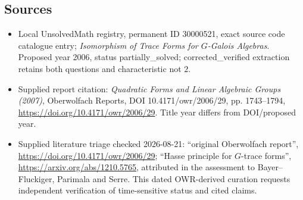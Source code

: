 \documentclass[11pt]{article}
\begin{document}
\subsection{Sources}
\begin{itemize}
\item Local UnsolvedMath registry, permanent ID 30000521, exact source code catalogue entry; \emph{Isomorphism of Trace Forms for $G$-Galois Algebras}. Proposed year 2006, status partially\_solved; corrected\_verified extraction retains both questions and characteristic not $2$.
\item Supplied report citation: \emph{Quadratic Forms and Linear Algebraic Groups (2007)}, Oberwolfach Reports, DOI 10.4171/owr/2006/29, pp. 1743--1794, \url{https://doi.org/10.4171/owr/2006/29}. Title year differs from DOI/proposed year.
\item Supplied literature triage checked 2026-08-21: ``original Oberwolfach report'', \url{https://doi.org/10.4171/owr/2006/29}; ``Hasse principle for $G$-trace forms'', \url{https://arxiv.org/abs/1210.5765}, attributed in the assessment to Bayer--Fluckiger, Parimala and Serre. This dated OWR-derived curation requests independent verification of time-sensitive status and cited claims.
\end{itemize}
\end{document}
